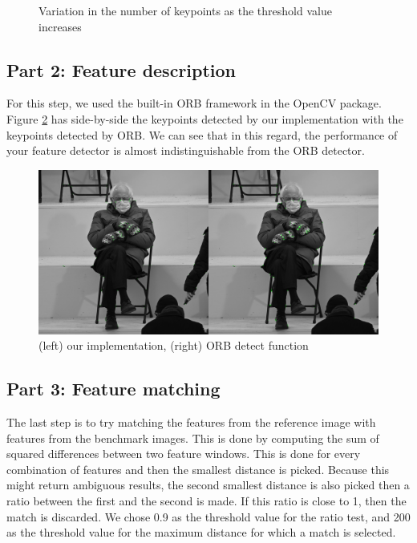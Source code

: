 \documentclass[12pt,a4paper]{report}
\begin{document}
\begin{figure}[ht]
	\centering
	\caption{Variation in the number of keypoints as the threshold value increases}
	\label{fig:kp}
\end{figure}

\subsection*{Part 2: Feature description}

For this step, we used the built-in ORB framework in the OpenCV package. Figure \ref{fig:com} has side-by-side the keypoints detected by our implementation with the keypoints detected by ORB. We can see that in this regard, the performance of your feature detector is almost indistinguishable from the ORB detector.

\begin{figure}[ht]
	\centering
	\includegraphics[width=\textwidth]{comparison}
	\caption{(left) our implementation, (right) ORB detect function}
	\label{fig:com}
\end{figure}

\subsection*{Part 3: Feature matching}
The last step is to try matching the features from the reference image with features from the benchmark images. This is done by computing the sum of squared differences between two feature windows. This is done for every combination of features and then the smallest distance is picked. Because this might return ambiguous results, the second smallest distance is also picked then a ratio between the first and the second is made. If this ratio is close to 1, then the match is discarded. We chose 0.9 as the threshold value for the ratio test, and 200 as the threshold value for the maximum distance for which a match is selected.
\end{document}
